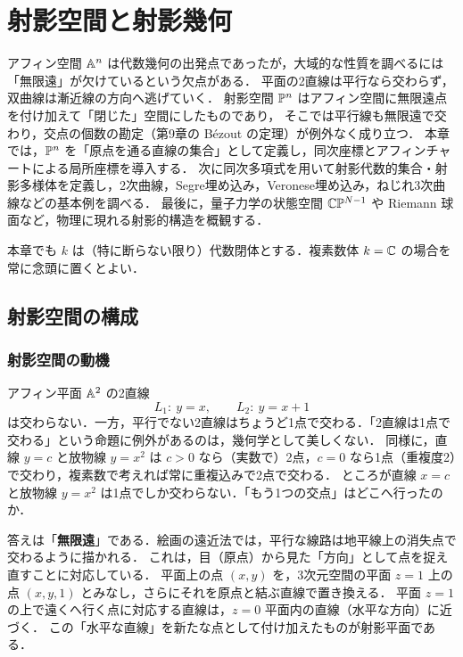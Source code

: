 \chapter{射影空間と射影幾何}
\label{ch:ch08}

\begin{chapterlead}
アフィン空間 $\mathbb{A}^n$ は代数幾何の出発点であったが，大域的な性質を調べるには「無限遠」が欠けているという欠点がある．
平面の2直線は平行なら交わらず，双曲線は漸近線の方向へ逃げていく．
射影空間 $\mathbb{P}^n$ はアフィン空間に無限遠点を付け加えて「閉じた」空間にしたものであり，
そこでは平行線も無限遠で交わり，交点の個数の勘定（第9章の Bézout の定理）が例外なく成り立つ．
本章では，$\mathbb{P}^n$ を「原点を通る直線の集合」として定義し，同次座標とアフィンチャートによる局所座標を導入する．
次に同次多項式を用いて射影代数的集合・射影多様体を定義し，2次曲線，Segre埋め込み，Veronese埋め込み，ねじれ3次曲線などの基本例を調べる．
最後に，量子力学の状態空間 $\mathbb{C}\mathbb{P}^{N-1}$ や Riemann 球面など，物理に現れる射影的構造を概観する．
\end{chapterlead}

本章でも $k$ は（特に断らない限り）代数閉体とする．複素数体 $k=\mathbb{C}$ の場合を常に念頭に置くとよい．

\section{射影空間の構成}

\subsection{射影空間の動機}

アフィン平面 $\mathbb{A}^2$ の2直線
\[
  L_1:\ y=x,\qquad L_2:\ y=x+1
\]
は交わらない．一方，平行でない2直線はちょうど1点で交わる．「2直線は1点で交わる」という命題に例外があるのは，幾何学として美しくない．
同様に，直線 $y=c$ と放物線 $y=x^2$ は $c>0$ なら（実数で）2点，$c=0$ なら1点（重複度2）で交わり，複素数で考えれば常に重複込みで2点で交わる．
ところが直線 $x=c$ と放物線 $y=x^2$ は1点でしか交わらない．「もう1つの交点」はどこへ行ったのか．

答えは「\textbf{無限遠}」である．絵画の遠近法では，平行な線路は地平線上の消失点で交わるように描かれる．
これは，目（原点）から見た「方向」として点を捉え直すことに対応している．
平面上の点 $(x,y)$ を，3次元空間の平面 $z=1$ 上の点 $(x,y,1)$ とみなし，さらにそれを原点と結ぶ直線で置き換える．
平面 $z=1$ の上で遠くへ行く点に対応する直線は，$z=0$ 平面内の直線（水平な方向）に近づく．
この「水平な直線」を新たな点として付け加えたものが射影平面である．

